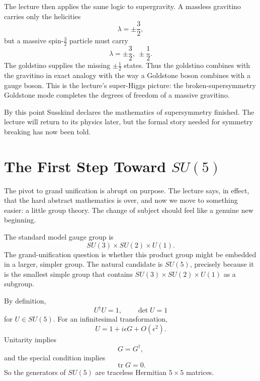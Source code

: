 The lecture then applies the same logic to supergravity. A massless gravitino carries only the helicities
\begin{equation}
\lambda=\pm \frac{3}{2},
\end{equation}
but a massive spin-\(\tfrac{3}{2}\) particle must carry
\begin{equation}
\lambda=\pm \frac{3}{2},\ \pm \frac{1}{2}.
\end{equation}
The goldstino supplies the missing \(\pm \tfrac{1}{2}\) states. Thus the goldstino combines with the gravitino in exact analogy with the way a Goldstone boson combines with a gauge boson. This is the lecture's super-Higgs picture: the broken-supersymmetry Goldstone mode completes the degrees of freedom of a massive gravitino.

By this point Susskind declares the mathematics of supersymmetry finished. The lecture will return to its physics later, but the formal story needed for symmetry breaking has now been told.

\section{The First Step Toward \(SU(5)\)}

The pivot to grand unification is abrupt on purpose. The lecture says, in effect, that the hard abstract mathematics is over, and now we move to something easier: a little group theory. The change of subject should feel like a genuine new beginning.

The standard model gauge group is
\begin{equation}
SU(3)\times SU(2)\times U(1).
\end{equation}
The grand-unification question is whether this product group might be embedded in a larger, simpler group. The natural candidate is \(SU(5)\), precisely because it is the smallest simple group that contains \(SU(3)\times SU(2)\times U(1)\) as a subgroup.

By definition,
\begin{equation}
U^\dagger U=1,
\qquad
\det U=1
\end{equation}
for \(U\in SU(5)\). For an infinitesimal transformation,
\begin{equation}
U=1+i\epsilon G+O(\epsilon^2).
\end{equation}
Unitarity implies
\begin{equation}
G=G^\dagger,
\end{equation}
and the special condition implies
\begin{equation}
\operatorname{tr}G=0.
\end{equation}
So the generators of \(SU(5)\) are traceless Hermitian \(5\times 5\) matrices.


